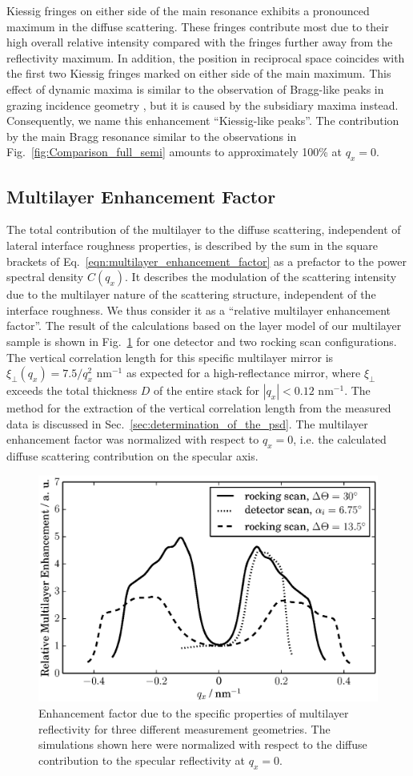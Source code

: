 Kiessig fringes on either side of the main resonance exhibits a pronounced maximum in the diffuse scattering. These fringes contribute most due to their high overall relative 
intensity compared with the fringes further away from the reflectivity maximum. In addition, the position in reciprocal space coincides with the first two Kiessig fringes marked on either side of the main maximum. This effect of dynamic maxima is similar to the observation of Bragg-like peaks in grazing incidence geometry \cite{PhysRevB.52.16369}, but it is caused by the subsidiary maxima instead. Consequently, we name this enhancement ``Kiessig-like peaks''. The contribution by the main Bragg resonance similar to the observations in Fig.~\ref{fig:Comparison_full_semi} amounts to approximately 100\% at $q_x=0$.

\subsection{Multilayer Enhancement Factor} \label{sec:multilayer_contribution}
The total contribution of the multilayer to the diffuse scattering, independent of lateral interface roughness properties, is described by the sum in the square brackets of Eq.~\eqref{eqn:multilayer_enhancement_factor} as a prefactor to the power spectral density $C(q_x)$. It describes the modulation of the scattering intensity due to the multilayer nature of the scattering structure, independent of the interface roughness. We thus consider it as a ``relative multilayer enhancement factor''. The result of the calculations based on the layer model of our multilayer sample is shown in Fig.~\ref{fig:MultilayerInfluence} for one detector and two rocking scan configurations. The vertical correlation length for this specific multilayer mirror is $\xi_\perp(q_x)=7.5/q_x^2$ nm$^{-1}$ as expected for a high-reflectance mirror, where $\xi_\perp$ 
exceeds the total thickness $D$ of the entire stack for $|q_x| < 0.12$ nm$^{-1}$. The method for the extraction of the vertical correlation length from the measured data is discussed in Sec.~\ref{sec:determination_of_the_psd}. The multilayer enhancement factor was normalized with respect to $q_x=0$, i.e. the calculated diffuse scattering contribution on the specular axis. 
\begin{figure}
        \includegraphics[width=0.5
        \textwidth]{img/im_mo_si/MEF} \caption{Enhancement factor due to the specific properties of multilayer reflectivity for three different measurement geometries. The simulations shown here were normalized with respect to the diffuse contribution to the specular reflectivity at $q_x=0$.} \label{fig:MultilayerInfluence} 
\end{figure}

